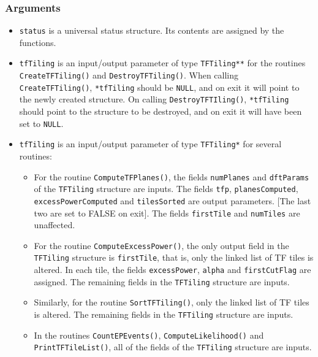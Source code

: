 \documentclass{article}
\begin{document}
\subsubsection{Arguments}


\begin{itemize}
\item \texttt{status} is a universal status structure.  Its contents are
assigned by the functions.


\item \texttt{tfTiling} is an input/output parameter of type
\verb+TFTiling**+ for the routines \verb+CreateTFTiling()+ and
\verb+DestroyTFTiling()+.  When calling \verb+CreateTFTiling()+,
\verb+*tfTiling+ should be \verb+NULL+, and on exit it will point to
the newly created structure.  On calling \verb+DestroyTFTIling()+, 
\verb+*tfTiling+ should point to the structure to be destroyed, and on
exit it will have been set to \verb+NULL+.


\item \texttt{tfTiling} is an input/output parameter of type
\verb+TFTiling*+ for several routines:
\begin{itemize}
\item For the routine \verb+ComputeTFPlanes()+, the fields
\verb+numPlanes+ and \verb+dftParams+ of the \verb+TFTiling+ structure
are inputs.  The fields \verb+tfp+, \verb+planesComputed+,
\verb+excessPowerComputed+ and \verb+tilesSorted+ are output
parameters.  [The last two are set to FALSE on exit].  The fields
\verb+firstTile+ and \verb+numTiles+ are unaffected. 

\item For the routine \verb+ComputeExcessPower()+, the only output
field in the \verb+TFTiling+ structure is \verb+firstTile+, that is,
only the linked list of TF tiles is altered.  In each tile, the fields
\verb+excessPower+, \verb+alpha+ 
and \verb+firstCutFlag+ are assigned.  The remaining fields in the
\verb+TFTiling+ structure are inputs.

\item Similarly, for the routine \verb+SortTFTiling()+, 
only the linked list of TF tiles is altered.  The remaining fields in the
\verb+TFTiling+ structure are inputs.

\item In the routines \verb+CountEPEvents()+,
\verb+ComputeLikelihood()+ and \verb+PrintTFTileList()+, all of the
fields of the \verb+TFTiling+ structure are inputs.


\end{itemize}
\end{itemize}
\end{document}
